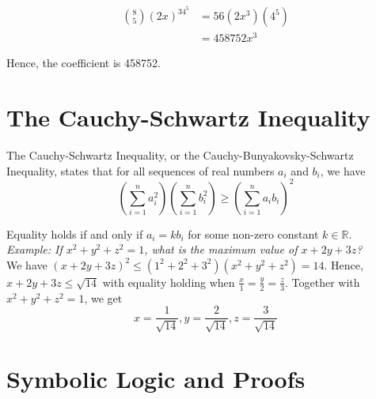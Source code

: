 \documentclass{article}
\begin{document}
    \begin{align}
        \binom{8}{5}(2x)^34^5 &= 56(2x^3)(4^5) \\
        &= 458752x^3
    \end{align}

    \noindent Hence, the coefficient is 458752.

    \pagebreak


    \section{The Cauchy-Schwartz Inequality}

    The Cauchy-Schwartz Inequality, or the Cauchy-Bunyakovsky-Schwartz Inequality, states
    that for all sequences of real numbers $a_i$ and $b_i$, we have \\

    \begin{equation*}
        (\sum^n_{i=1}a_i^2)
        (\sum^n_{i=1}b_i^2)
        \geq
        (\sum^n_{i=1}a_ib_i)^2
    \end{equation*}

    \noindent Equality holds if and only if $a_i=kb_i$ for some non-zero constant
    $k\in\mathbb{R}$. \\

    \noindent \color{blue} \textit{Example: If $x^2+y^2+z^2=1$, what is the maximum
    value of $x+2y+3z$?} \color{black} \\

    \noindent We have $(x+2y+3z)^2\leq(1^2+2^2+3^2)(x^2+y^2+z^2)=14$. Hence, $x+2y+3z\leq\sqrt{14}$
    with equality holding when $\frac{x}{1}=\frac{y}{2}=\frac{z}{3}$. Together with
    $x^2+y^2+z^2=1$, we get \\

    \begin{equation*}
        x=\frac{1}{\sqrt{14}},
        y=\frac{2}{\sqrt{14}},
        z=\frac{3}{\sqrt{14}}
    \end{equation*}

    \pagebreak


    \section{Symbolic Logic and Proofs}
\end{document}

